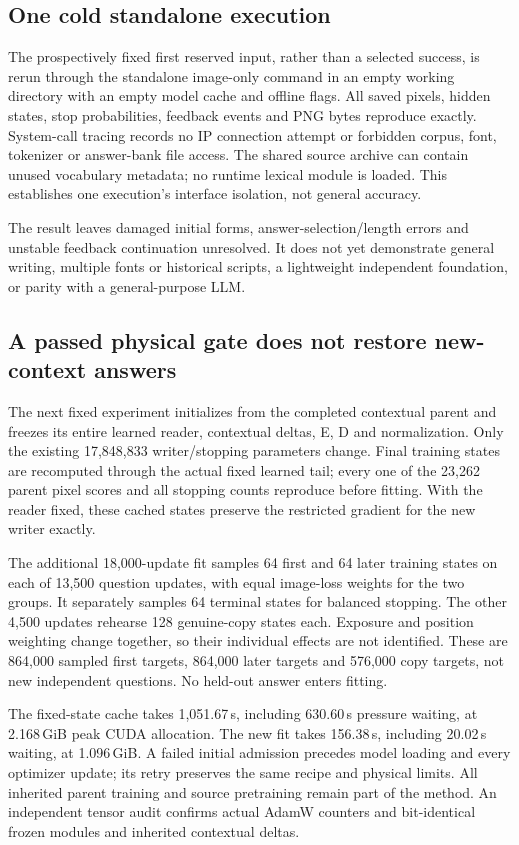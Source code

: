 \subsection*{One cold standalone execution}
The prospectively fixed first reserved input, rather than a selected success,
is rerun through the standalone image-only command in an empty working
directory with an empty model cache and offline flags. All saved pixels,
hidden states, stop probabilities, feedback events and PNG bytes reproduce
exactly. System-call tracing records no IP connection attempt or forbidden
corpus, font, tokenizer or answer-bank file access. The shared source archive
can contain unused vocabulary metadata; no runtime lexical module is loaded.
This establishes one execution's interface isolation, not general accuracy.

The result leaves damaged initial forms, answer-selection/length errors and
unstable feedback continuation unresolved. It does not yet demonstrate
general writing, multiple fonts or historical scripts, a lightweight
independent foundation, or parity with a general-purpose LLM.

\subsection*{A passed physical gate does not restore new-context answers}
The next fixed experiment initializes from the completed contextual parent
and freezes its entire learned reader, contextual deltas, E, D and normalization.
Only the existing 17,848,833 writer/stopping parameters change. Final training
states are recomputed through the actual fixed learned tail; every one of the
23,262 parent pixel scores and all stopping counts reproduce before fitting.
With the reader fixed, these cached states preserve the restricted gradient
for the new writer exactly.

The additional 18,000-update fit samples 64 first and 64 later training states
on each of 13,500 question updates, with equal image-loss weights for the two
groups. It separately samples 64 terminal states for balanced stopping. The
other 4,500 updates rehearse 128 genuine-copy states each. Exposure and position
weighting change together, so their individual effects are not identified.
These are 864,000 sampled first targets, 864,000 later targets and 576,000 copy
targets, not new independent questions. No held-out answer enters fitting.

The fixed-state cache takes 1,051.67\,s, including 630.60\,s pressure waiting,
at 2.168\,GiB peak CUDA allocation. The new fit takes 156.38\,s, including
20.02\,s waiting, at 1.096\,GiB. A failed initial admission precedes model
loading and every optimizer update; its retry preserves the same recipe and
physical limits. All inherited parent training and source pretraining remain
part of the method. An independent tensor audit confirms actual AdamW counters
and bit-identical frozen modules and inherited contextual deltas.


